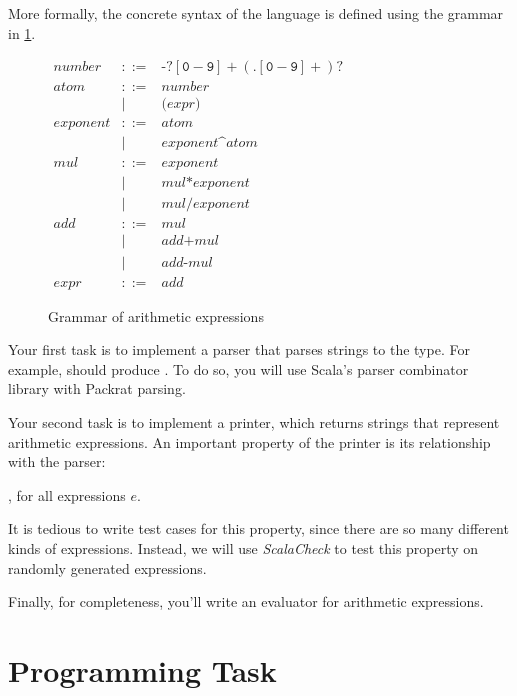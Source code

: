 \documentclass[9pt]{extbook}
\begin{document}
More formally, the concrete syntax of the language is defined using the grammar in \cref{parsing_grammar}.

\begin{figure}
\(
\begin{array}{rcl}
\mathit{number} & ::= & \texttt{-}?[\texttt{0}-\texttt{9}]+ (\texttt{.}[\texttt{0}-\texttt{9}]+)? \\
\mathit{atom} & ::= & \mathit{number} \\
              & \mid & \texttt{(} \mathit{expr} \texttt{)}  \\
\mathit{exponent} & ::= & \mathit{atom} \\
                 & \mid & \mathit{exponent} \texttt{\textasciicircum} \mathit{atom} \\
\mathit{mul} & ::= & \mathit{exponent} \\
& \mid & \mathit{mul} \texttt{*} \mathit{exponent} \\
& \mid & \mathit{mul} \texttt{/} \mathit{exponent} \\
\mathit{add} & ::= & \mathit{mul} \\
& \mid & \mathit{add} \texttt{+} \mathit{mul} \\
& \mid & \mathit{add} \texttt{-} \mathit{mul} \\
\mathit{expr} & ::= & \mathit{add}
\end{array}
\)
\caption{Grammar of arithmetic expressions}
\label{parsing_grammar}
\end{figure}

Your first task is to implement a parser that parses strings to the  type. For example,  should produce . To do so, you will use Scala's parser combinator library with Packrat parsing.

Your second task is to implement a printer, which returns strings that represent arithmetic expressions. An important property of the printer is its relationship with the parser:

, for all expressions $e$.

It is tedious to write test cases for this property, since there are so many different kinds of expressions. Instead, we will use \emph{ScalaCheck} to test this property on randomly generated expressions.

Finally, for completeness, you'll write an evaluator for arithmetic expressions.


\section{Programming Task}
\end{document}
